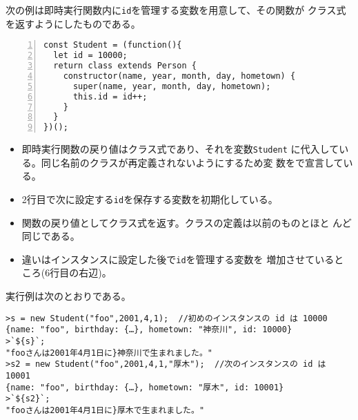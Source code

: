 \begin{Exec}\upshape
次の例は即時実行関数内に\texttt{id}を管理する変数を用意して、その関数が
 クラス式を返すようにしたものである。
\begin{Verbatim}[numbers=left]
const Student = (function(){
  let id = 10000;
  return class extends Person {
    constructor(name, year, month, day, hometown) {
      super(name, year, month, day, hometown);
      this.id = id++;
    }
  }
})();
\end{Verbatim}
 \begin{itemize}
  \item 即時実行関数の戻り値はクラス式であり、それを変数\texttt{Student}
        に代入している。同じ名前のクラスが再定義されないようにするため変
        数をで宣言している。
  \item 2行目で次に設定する\texttt{id}を保存する変数を初期化している。
  \item 関数の戻り値としてクラス式を返す。クラスの定義は以前のものとほと
        んど同じである。
  \item 違いはインスタンスに設定した後で\texttt{id}を管理する変数を
        増加させているところ(6行目の右辺)。
 \end{itemize}
 実行例は次のとおりである。
\begin{Verbatim}
>s = new Student("foo",2001,4,1);  //初めのインスタンスの id は 10000
{name: "foo", birthday: {…}, hometown: "神奈川", id: 10000}
>`${s}`;
"fooさんは2001年4月1日に}神奈川で生まれました。"
>s2 = new Student("foo",2001,4,1,"厚木");  //次のインスタンスの id は 10001
{name: "foo", birthday: {…}, hometown: "厚木", id: 10001}
>`${s2}`;
"fooさんは2001年4月1日に}厚木で生まれました。"
\end{Verbatim}
\end{Exec}
\iffalse
